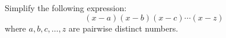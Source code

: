 Simplify the following expression:
\[
(x - a)(x - b)(x - c) \cdots (x - z)
\]
where $a, b, c, \ldots, z$ are pairwise distinct numbers.
